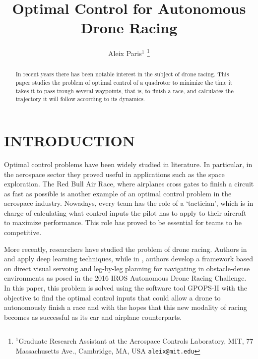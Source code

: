 \documentclass[letterpaper, 10 pt, conference]{ieeeconf}  %
\title{\LARGE \bf
Optimal Control for Autonomous Drone Racing
}
\author{Aleix Paris$^{1}$%
\thanks{$^{1}$Graduate Research Assistant at the Aerospace Controls Laboratory,
        MIT, 77 Massachusetts Ave., Cambridge, MA, USA
        {\tt\small aleix@mit.edu}}%
}
\begin{document}
\maketitle
\thispagestyle{empty}
\pagestyle{empty}


\begin{abstract}

In recent years there has been notable interest in the subject of drone racing. This paper studies the problem of optimal control of a quadrotor to minimize the time it takes it to pass trough several waypoints, that is, to finish a race, and calculates the trajectory it will follow according to its dynamics.

\end{abstract}


\section{INTRODUCTION}\label{s:intro}

Optimal control problems have been widely studied in literature. In particular, in the aerospace sector they proved useful in applications such as the space exploration. The Red Bull Air Race, where airplanes cross gates to finish a circuit as fast as possible is another example of an optimal control problem in the aerospace industry. Nowadays, every team has the role of a `tactician', which is in charge of calculating what control inputs the pilot has to apply to their aircraft to maximize performance. This role has proved to be essential for teams to be competitive.

More recently, researchers have studied the problem of drone racing. Authors in \cite{jung2018perception} and \cite{kaufmann2018deep} apply deep learning techniques, while in \cite{jung2018direct}, authors develop a framework based on direct visual servoing and leg-by-leg planning for navigating in obstacle-dense environments as posed in the 2016 IROS Autonomous Drone Racing Challenge. In this paper, this problem is solved using the software tool GPOPS-II \cite{patterson2014gpops} with the objective to find the optimal control inputs that could allow a drone to autonomously finish a race and with the hopes that this new modality of racing becomes as successful as its car and airplane counterparts.
\end{document}

